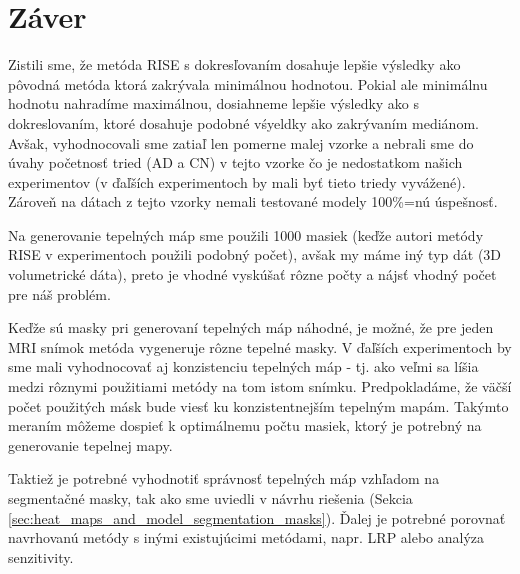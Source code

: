 \section{Záver}

Zistili sme, že metóda RISE s dokresľovaním dosahuje lepšie výsledky ako pôvodná metóda ktorá zakrývala minimálnou hodnotou. Pokial ale minimálnu hodnotu nahradíme maximálnou, dosiahneme lepšie výsledky ako s dokreslovaním, ktoré dosahuje podobné vśyeldky ako zakrývaním mediánom. Avšak, vyhodnocovali sme zatiaľ len pomerne malej vzorke a nebrali sme do úvahy početnosť tried (AD a CN) v tejto vzorke čo je nedostatkom našich experimentov (v ďaľších experimentoch by mali byť tieto triedy vyvážené). Zároveň na dátach z tejto vzorky nemali testované modely 100\%=nú úspešnosť.

Na generovanie tepelných máp sme použili 1000 masiek (keďže autori metódy RISE v experimentoch použili podobný počet), avšak my máme iný typ dát (3D volumetrické dáta), preto je vhodné vyskúšať rôzne počty a nájsť vhodný počet pre náš problém.

Keďže sú masky pri generovaní tepelných máp náhodné, je možné, že pre jeden MRI snímok metóda vygeneruje rôzne tepelné masky. V ďaľších experimentoch by sme mali vyhodnocovať aj konzistenciu tepelných máp - tj. ako veľmi sa líšia medzi rôznymi použitiami metódy na tom istom snímku. Predpokladáme, že väčší počet použitých másk bude viesť ku konzistentnejším tepelným mapám. Takýmto meraním môžeme dospieť k optimálnemu počtu masiek, ktorý je potrebný na generovanie tepelnej mapy.

Taktiež je potrebné vyhodnotiť správnosť tepelných máp vzhľadom na segmentačné masky, tak ako sme uviedli v návrhu riešenia (Sekcia \ref{sec:heat_maps_and_model_segmentation_masks}). Ďalej je potrebné porovnať navrhovanú metódy s inými existujúcimi metódami, napr. LRP alebo analýza senzitivity.


